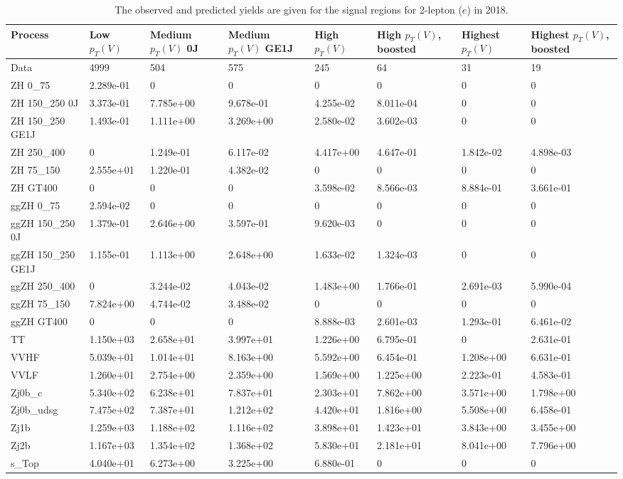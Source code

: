 \begin{table}
\centering
\caption[2018 2-lepton ($e$) signal selection yields]{
                  The observed and predicted yields are given for the
                  signal regions for 2-lepton ($e$) in 2018.
                  }
{\footnotesize
\begin{tabularx}{\textwidth}{|X|X|X|X|X|X|X|X|}
\hline
Process & Low $p_{T}(V)$ & Medium $p_{T}(V)$ 0J & Medium $p_{T}(V)$ GE1J & High $p_{T}(V)$ & High $p_{T}(V)$, boosted & Highest $p_{T}(V)$ & Highest $p_{T}(V)$, boosted \\
\hline
Data & 4999 & 504 & 575 & 245 & 64 & 31 & 19 \\
\hline
ZH 0\_75 & 2.289e-01 & 0 & 0 & 0 & 0 & 0 & 0 \\
ZH 150\_250 0J & 3.373e-01 & 7.785e+00 & 9.678e-01 & 4.255e-02 & 8.011e-04 & 0 & 0 \\
ZH 150\_250 GE1J & 1.493e-01 & 1.111e+00 & 3.269e+00 & 2.580e-02 & 3.602e-03 & 0 & 0 \\
ZH 250\_400 & 0 & 1.249e-01 & 6.117e-02 & 4.417e+00 & 4.647e-01 & 1.842e-02 & 4.898e-03 \\
ZH 75\_150 & 2.555e+01 & 1.220e-01 & 4.382e-02 & 0 & 0 & 0 & 0 \\
ZH GT400 & 0 & 0 & 0 & 3.598e-02 & 8.566e-03 & 8.884e-01 & 3.661e-01 \\
ggZH 0\_75 & 2.594e-02 & 0 & 0 & 0 & 0 & 0 & 0 \\
ggZH 150\_250 0J & 1.379e-01 & 2.646e+00 & 3.597e-01 & 9.620e-03 & 0 & 0 & 0 \\
ggZH 150\_250 GE1J & 1.155e-01 & 1.113e+00 & 2.648e+00 & 1.633e-02 & 1.324e-03 & 0 & 0 \\
ggZH 250\_400 & 0 & 3.244e-02 & 4.043e-02 & 1.483e+00 & 1.766e-01 & 2.691e-03 & 5.990e-04 \\
ggZH 75\_150 & 7.824e+00 & 4.744e-02 & 3.488e-02 & 0 & 0 & 0 & 0 \\
ggZH GT400 & 0 & 0 & 0 & 8.888e-03 & 2.601e-03 & 1.293e-01 & 6.461e-02 \\
\hline
TT & 1.150e+03 & 2.658e+01 & 3.997e+01 & 1.226e+00 & 6.795e-01 & 0 & 2.631e-01 \\
VVHF & 5.039e+01 & 1.014e+01 & 8.163e+00 & 5.592e+00 & 6.454e-01 & 1.208e+00 & 6.631e-01 \\
VVLF & 1.260e+01 & 2.754e+00 & 2.359e+00 & 1.569e+00 & 1.225e+00 & 2.223e-01 & 4.583e-01 \\
Zj0b\_c & 5.340e+02 & 6.238e+01 & 7.837e+01 & 2.303e+01 & 7.862e+00 & 3.571e+00 & 1.798e+00 \\
Zj0b\_udsg & 7.475e+02 & 7.387e+01 & 1.212e+02 & 4.420e+01 & 1.816e+00 & 5.508e+00 & 6.458e-01 \\
Zj1b & 1.259e+03 & 1.188e+02 & 1.116e+02 & 3.898e+01 & 1.423e+01 & 3.843e+00 & 3.455e+00 \\
Zj2b & 1.167e+03 & 1.354e+02 & 1.368e+02 & 5.830e+01 & 2.181e+01 & 8.041e+00 & 7.796e+00 \\
s\_Top & 4.040e+01 & 6.273e+00 & 3.225e+00 & 6.880e-01 & 0 & 0 & 0 \\
\hline
\end{tabularx}
}
\label{tab:sr-Zee-2018}
\end{table}


